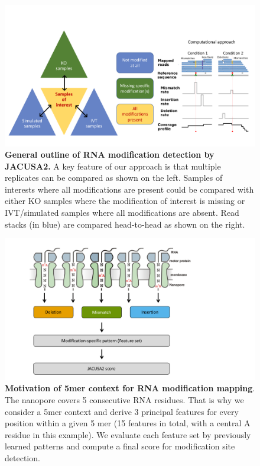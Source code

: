 \documentclass[times, 11pt, a4paper]{article}
\begin{document}
\begin{figure}[h!]
    \includegraphics[width = 1\textwidth]{Figure1.pdf}
  \caption{\textbf{General outline of RNA modification detection by JACUSA2.} A key feature of our approach is that multiple replicates can be compared as shown on the left. Samples of interests where all modifications are present could be compared with either KO samples where the modification of interest is missing or IVT/simulated samples where all modifications are absent. Read stacks (in blue) are compared head-to-head as shown on the right. }
  \label{fig:graphicsummary}
      \end{figure}
\newpage

\begin{figure}[h!]
    \includegraphics[width = 1\textwidth]{Figure2.pdf}
  \caption{\textbf{Motivation of 5mer context for RNA modification mapping}. The nanopore covers 5 consecutive RNA residues. That is why we consider a 5mer context and derive 3 principal features for every position within a given 5 mer (15 features in total, with a central A residue in this example). We evaluate each feature set by previously learned patterns and compute a final score for modification site detection.}
  \label{fig:5mer}
      \end{figure}
\newpage
\end{document}

